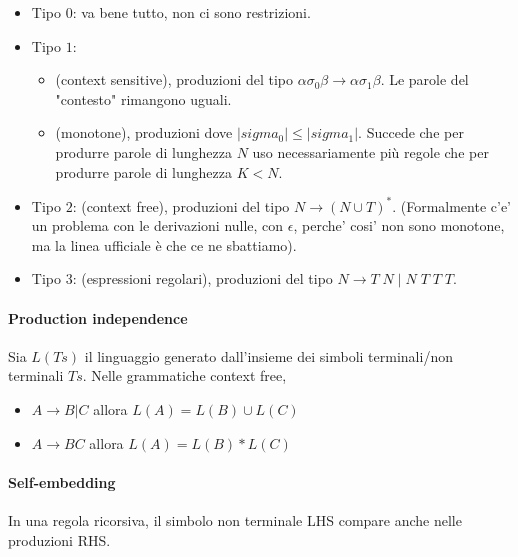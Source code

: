 \begin{itemize}
  \item Tipo $0$: va bene tutto, non ci sono restrizioni.
  \item Tipo $1$:
  \begin{itemize}
    \item (context sensitive), produzioni del tipo $\alpha \sigma_0 \beta \rightarrow \alpha \sigma_1 \beta$. Le parole del "contesto" rimangono uguali.
    \item (monotone), produzioni dove $|sigma_0| \leq |sigma_1|$. Succede che per produrre parole di lunghezza $N$ uso necessariamente pi\`u regole che per produrre parole di lunghezza $K < N$.
  \end{itemize}
\item Tipo $2$: (context free), produzioni del tipo $N \rightarrow (N \cup T)^{*}$. (Formalmente c'e' un problema con le derivazioni nulle, con $\epsilon$, perche' cosi' non sono monotone, ma la linea ufficiale \`e che ce ne sbattiamo).
  \item Tipo $3$: (espressioni regolari), produzioni del tipo $N \rightarrow T \; N \; | \; N \; T \; T \; T$.
\end{itemize}

\paragraph{Production independence}

Sia $L(Ts)$ il linguaggio generato dall'insieme dei simboli terminali/non terminali $Ts$.
Nelle grammatiche context free,
\begin{itemize}
  \item $A \rightarrow B|C $ allora $ L(A) = L(B) \cup L(C)$
  \item $A \rightarrow BC $ allora $ L(A) = L(B) * L(C)$
\end{itemize}

\paragraph{Self-embedding}

In una regola ricorsiva, il simbolo non terminale LHS compare anche nelle produzioni RHS.
